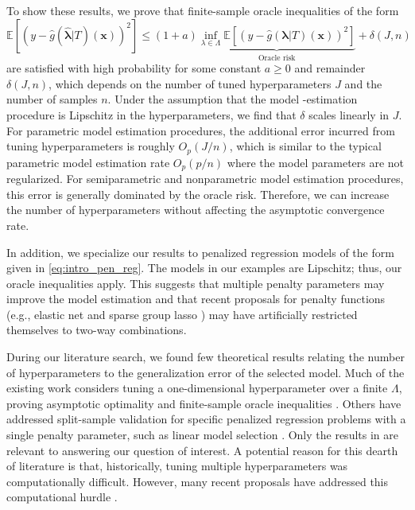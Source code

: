 \documentclass[12pt]{article} %
\theoremstyle{definition}
\begin{document}
To show these results, we prove that finite-sample oracle inequalities of the form
\begin{equation}
\label{thrm:intro_oracle_ineq}
\mathbb{E} \left [
\left ( y - \hat{g}(\hat{\boldsymbol{\lambda}} | T)(\boldsymbol{x}) \right )^2
\right ]
\le
(1+a)
\underbrace{
	\inf_{\lambda \in \Lambda}
	\mathbb{E} \left [
	\left ( y - \hat{g}(\boldsymbol{\lambda} | T)(\boldsymbol{x}) \right )^2
	\right ]
}_{\text{Oracle risk}}
+ \delta \left(J,n\right)
\end{equation}
are satisfied with high probability for some constant $a \ge 0$ and remainder $\delta(J,n)$, which depends on the number of tuned hyperparameters $J$ and the number of samples $n$.
Under the assumption that the model -estimation procedure is Lipschitz in the hyperparameters, we find that $\delta$ scales linearly in $J$.
For parametric model estimation procedures, the additional error incurred from tuning hyperparameters is roughly $O_p(J/n)$, which is similar to the typical parametric model estimation rate $O_p(p/n)$ where the model parameters are not regularized.
For semiparametric and nonparametric model estimation procedures, this error is generally dominated by the oracle risk.
Therefore, we can increase the number of hyperparameters without affecting the asymptotic convergence rate.

In addition, we specialize our results to penalized regression models of the form given in \eqref{eq:intro_pen_reg}.
The models in our examples are Lipschitz; thus, our oracle inequalities apply.
This suggests that multiple penalty parameters may improve the model estimation and that recent proposals for penalty functions (e.g., elastic net and sparse group lasso \citep{zou2003regression, simon2013sparse}) may have artificially restricted themselves to two-way combinations.

During our literature search, we found few theoretical results relating the number of hyperparameters to the generalization error of the selected model.
Much of the existing work considers tuning a one-dimensional hyperparameter over a finite $\Lambda$, proving asymptotic optimality \citep*{Van_der_Laan2004-bp} and finite-sample oracle inequalities \citep{Van_der_Laan2003-ei, gyorfi2002distribution}. Others have addressed split-sample validation for specific penalized regression problems with a single penalty parameter, such as linear model selection \citep*{li1987asymptotic, shao1997asymptotic, golub1979generalized, chetverikov2016cross, chatterjee2015prediction}.
Only the results in \citet{lecue2012oracle} are relevant to answering our question of interest. A potential reason for this dearth of literature is that, historically, tuning multiple hyperparameters was computationally difficult.
However, many recent proposals have addressed this computational hurdle \citep*{bengio2000gradient, foo2008efficient, snoek2012practical}.
\end{document}
